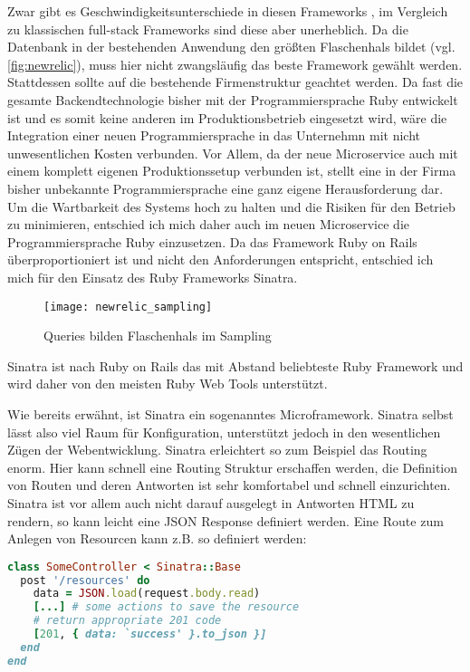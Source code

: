 Zwar gibt es Geschwindigkeitsunterschiede in diesen Frameworks \cite[vgl.][]{frameworks}, im Vergleich zu klassischen full-stack Frameworks sind diese aber unerheblich. Da die Datenbank in der bestehenden Anwendung den größten Flaschenhals bildet (vgl. \autoref{fig:newrelic}), muss hier nicht zwangsläufig das beste Framework gewählt werden. Stattdessen sollte auf die bestehende Firmenstruktur geachtet werden. Da fast die gesamte Backendtechnologie bisher mit der Programmiersprache Ruby entwickelt ist und es somit keine anderen im Produktionsbetrieb eingesetzt wird, wäre die Integration einer neuen Programmiersprache in das Unternehmn mit nicht unwesentlichen Kosten verbunden. Vor Allem, da der neue Microservice auch mit einem komplett eigenen Produktionssetup verbunden ist, stellt eine in der Firma bisher unbekannte Programmiersprache eine ganz eigene Herausforderung dar. Um die Wartbarkeit des Systems hoch zu halten und die Risiken für den Betrieb zu minimieren, entschied ich mich daher auch im neuen Microservice die Programmiersprache Ruby einzusetzen. Da das Framework Ruby on Rails überproportioniert ist und nicht den Anforderungen entspricht, entschied ich mich für den Einsatz des Ruby Frameworks Sinatra.
\begin{figure}[!ht]
    \centering
    \caption{Queries bilden Flaschenhals im Sampling}
    \label{fig:newrelic}
    \texttt{[image: newrelic\_sampling]}
\end{figure}
Sinatra ist nach Ruby on Rails das mit Abstand beliebteste Ruby Framework\cite[vgl.][]{ruby2015} und wird daher von den meisten Ruby Web Tools unterstützt.

Wie bereits erwähnt, ist Sinatra ein sogenanntes Microframework. Sinatra selbst lässt also viel Raum für Konfiguration, unterstützt jedoch in den wesentlichen Zügen der Webentwicklung. Sinatra erleichtert so zum Beispiel das Routing enorm. Hier kann schnell eine Routing Struktur erschaffen werden, die Definition von Routen und deren Antworten ist sehr komfortabel und schnell einzurichten. Sinatra ist vor allem auch nicht darauf ausgelegt in Antworten HTML zu rendern, so kann leicht eine JSON Response definiert werden.
Eine Route zum Anlegen von Resourcen kann z.B. so definiert werden:
\begin{lstlisting}[language=Ruby]
class SomeController < Sinatra::Base
  post '/resources' do
    data = JSON.load(request.body.read)
    [...] # some actions to save the resource
    # return appropriate 201 code
    [201, { data: `success' }.to_json }]
  end
end
\end{lstlisting}

